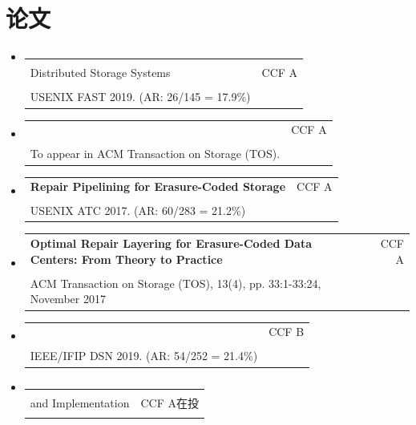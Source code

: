 \documentclass[letterpaper,11pt]{article}
\makeatletter
\newcommand{\resumeSubheading}[4]{
  \vspace{-1pt}\item
    \begin{tabular*}{0.97\textwidth}[t]{l@{\extracolsep{\fill}}r}
      \textbf{#1} & #2 \\
      \textit{\small#3} & \textit{\small #4} \\
    \end{tabular*}\vspace{-5pt}
}
\newcommand{\resumeSubHeadingListStart}{\begin{itemize}[leftmargin=*]}
\newcommand{\resumeSubHeadingListEnd}{\end{itemize}}
\makeatother
\begin{document}
\section{论文}
  \resumeSubHeadingListStart
    \resumeSubheading
      {\makecell[l]{OpenEC: Toward Unified and Configurable Erasure Coding Management in
      \\Distributed Storage Systems}}{CCF A}
      {\makecell[l]{{\bf Xiaolu Li}, Runhui Li, Patrick P. C. Lee, and Yuchong Hu. \\USENIX FAST 2019. (AR: 26/145 = 17.9\%)}}{}
    \resumeSubheading
      {\makecell[l]{Repair Pipelining for Erasure-Coded Storage: Algorithms and Evaluation.}}{CCF A}
      {\makecell[l]{{\bf Xiaolu Li}, Zuoru Yang, Jinhong Li, Runhui Li, Patrick P. C. Lee, Qun Huang and Yuchong Hu. \\To appear in ACM Transaction on Storage (TOS).}}{}
    \resumeSubheading
      {Repair Pipelining for Erasure-Coded Storage}{CCF A}
      {\makecell[l]{Runhui Li, {\bf Xiaolu Li}, Patrick P.C. Lee and Qun Huang. \\USENIX ATC 2017. (AR: 60/283 = 21.2\%)}}{}
    \resumeSubheading
      {Optimal Repair Layering for Erasure-Coded Data Centers: From Theory to Practice}{CCF A}
      {\makecell[l]{Yuchong Hu, {\bf Xiaolu Li}, Mi Zhang, Patrick P. C. Lee, Xiaoyang Zhang, Pan Zhou, and Dan Feng. \\ACM Transaction on Storage  (TOS), 13(4), pp. 33:1-33:24,
      November 2017}}{}
    \resumeSubheading
      {\makecell[l]{Fast Predictive Repair in Erasure-Coded Storage}}{CCF B}
      {\makecell[l]{Zhirong Shen, {\bf Xiaolu Li} and Patrick P. C. Lee. \\IEEE/IFIP DSN 2019. (AR: 54/252 = 21.4\%)}}{}
    \resumeSubheading
      {\makecell[l]{Fast Predictive Repair in Erasure-Coded Storage: Analysis, Design, \\and
      Implementation}}{CCF A在投}
      {\makecell[l]{{\bf Xiaolu Li}, Keyun Cheng, Zhirong Shen, and Patrick P. C. Lee. }}{}

  \resumeSubHeadingListEnd

\end{document}
